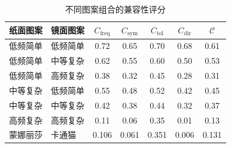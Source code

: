 \begin{table}[H]
\centering
\caption{不同图案组合的兼容性评分}\label{tab:compatibility}
\begin{tabular}{llccccc}
\toprule
纸面图案 & 镜面图案 & $C_{\text{freq}}$ & $C_{\text{sym}}$ & $C_{\text{tol}}$ & $C_{\text{dir}}$ & $\mathcal{C}$\\
\midrule
低频简单 & 低频简单 & 0.72 & 0.65 & 0.70 & 0.68 & 0.61\\
低频简单 & 中等复杂 & 0.62 & 0.55 & 0.60 & 0.50 & 0.53\\
低频简单 & 高频复杂 & 0.38 & 0.32 & 0.45 & 0.28 & 0.31\\
中等复杂 & 低频简单 & 0.55 & 0.48 & 0.52 & 0.42 & 0.45\\
中等复杂 & 中等复杂 & 0.42 & 0.38 & 0.44 & 0.32 & 0.37\\
高频复杂 & 高频复杂 & 0.11 & 0.06 & 0.35 & 0.01 & 0.13\\
蒙娜丽莎 & 卡通猫   & 0.106 & 0.061 & 0.351 & 0.006 & 0.131\\
\bottomrule
\end{tabular}
\end{table}
